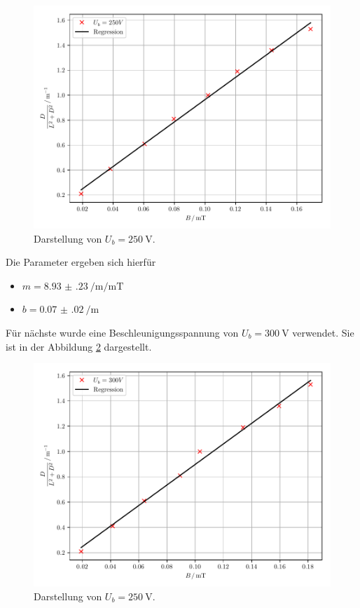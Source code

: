 \begin{figure}[H]
  \centering
  \includegraphics{plot7.pdf}
  \caption{Darstellung von $U_b=\SI{250}{\volt}$.}
  \label{abb:12}
\end{figure}
Die Parameter ergeben sich hierfür
\begin{itemize}
  \item $m = \SI[per-mode=fraction]{8.93(23)}{\per\meter\per\milli\tesla}$
  \item $b =\SI[per-mode=fraction]{0.07(02)}{\per\meter}$
\end{itemize}
Für nächste wurde eine Beschleunigungsspannung von $U_b = \SI{300}{\volt}$ verwendet.
Sie ist in der Abbildung \ref{abb:13} dargestellt.
\begin{figure}[H]
  \centering
  \includegraphics{plot8.pdf}
  \caption{Darstellung von $U_b=\SI{250}{\volt}$.}
  \label{abb:13}
\end{figure}
